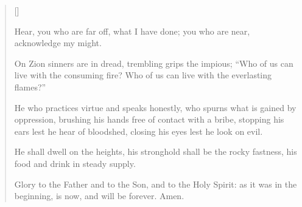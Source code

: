 \settowidth{\versewidth}{Who of us can live with the everlasting flames?”}
\begin{verse}[\versewidth]
  \begin{patverse}
Hear, you who are far off,
what I have done;
you who are near,
acknowledge my might.

On Zion sinners are in dread,
trembling grips the impious;
“Who of us can live with the consuming fire?
Who of us can live with the everlasting flames?”

He who practices virtue and speaks honestly,
who spurns what is gained by oppression,
brushing his hands
free of contact with a bribe,
stopping his ears lest he hear of bloodshed,
closing his eyes lest he look on evil.

He shall dwell on the heights,
his stronghold shall be the rocky fastness,
his food and drink
in steady supply.

Glory to the Father and to the Son,
and to the Holy Spirit:
as it was in the beginning, is now,
and will be forever. Amen. 
  \end{patverse}
\end{verse}
